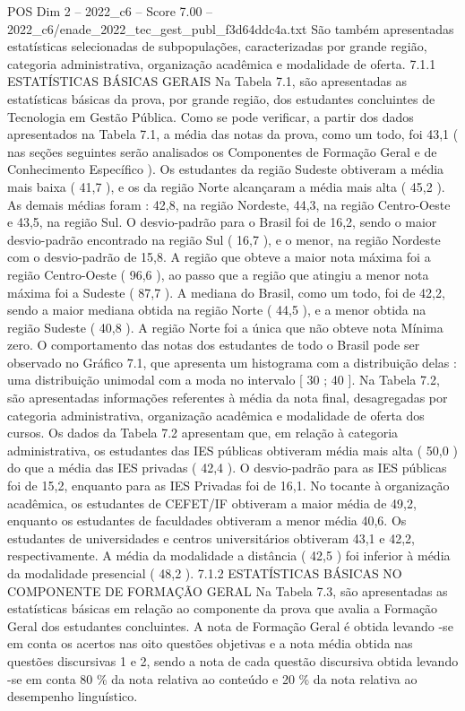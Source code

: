 \begin{textsample}{POS Dim 2 – 2022\_c6 – Score 7.00 – 2022\_c6/enade\_2022\_tec\_gest\_publ\_f3d64ddc4a.txt}
São também apresentadas estatísticas selecionadas de subpopulações, caracterizadas por grande região, categoria administrativa, organização acadêmica e modalidade de oferta. 7.1.1 ESTATÍSTICAS BÁSICAS GERAIS Na Tabela 7.1, são apresentadas as estatísticas básicas da prova, por grande região, dos estudantes concluintes de Tecnologia em Gestão Pública.
Como se pode verificar, a partir dos dados apresentados na Tabela 7.1, a média das notas da prova, como um todo, foi 43,1 ( nas seções seguintes serão analisados os Componentes de Formação Geral e de Conhecimento Específico ).
Os estudantes da região Sudeste obtiveram a média mais baixa ( 41,7 ), e os da região Norte alcançaram a média mais alta ( 45,2 ).
As demais médias foram : 42,8, na região Nordeste, 44,3, na região Centro-Oeste e 43,5, na região Sul.
O desvio-padrão para o Brasil foi de 16,2, sendo o maior desvio-padrão encontrado na região Sul ( 16,7 ), e o menor, na região Nordeste com o desvio-padrão de 15,8.
A região que obteve a maior nota máxima foi a região Centro-Oeste ( 96,6 ), ao passo que a região que atingiu a menor nota máxima foi a Sudeste ( 87,7 ).
A mediana do Brasil, como um todo, foi de 42,2, sendo a maior mediana obtida na região Norte ( 44,5 ), e a menor obtida na região Sudeste ( 40,8 ).
A região Norte foi a única que não obteve nota Mínima zero.
O comportamento das notas dos estudantes de todo o Brasil pode ser observado no Gráfico 7.1, que apresenta um histograma com a distribuição delas : uma distribuição unimodal com a moda no intervalo [ 30 ; 40 ].
Na Tabela 7.2, são apresentadas informações referentes à média da nota final, desagregadas por categoria administrativa, organização acadêmica e modalidade de oferta dos cursos.
Os dados da Tabela 7.2 apresentam que, em relação à categoria administrativa, os estudantes das IES públicas obtiveram média mais alta ( 50,0 ) do que a média das IES privadas ( 42,4 ).
O desvio-padrão para as IES públicas foi de 15,2, enquanto para as IES Privadas foi de 16,1.
No tocante à organização acadêmica, os estudantes de CEFET/IF obtiveram a maior média de 49,2, enquanto os estudantes de faculdades obtiveram a menor média 40,6.
Os estudantes de universidades e centros universitários obtiveram 43,1 e 42,2, respectivamente.
A média da modalidade a distância ( 42,5 ) foi inferior à média da modalidade presencial ( 48,2 ). 7.1.2 ESTATÍSTICAS BÁSICAS NO COMPONENTE DE FORMAÇÃO GERAL Na Tabela 7.3, são apresentadas as estatísticas básicas em relação ao componente da prova que avalia a Formação Geral dos estudantes concluintes.
A nota de Formação Geral é obtida levando -se em conta os acertos nas oito questões objetivas e a nota média obtida nas questões discursivas 1 e 2, sendo a nota de cada questão discursiva obtida levando -se em conta 80 \% da nota relativa ao conteúdo e 20 \% da nota relativa ao desempenho linguístico.

\end{textsample}
